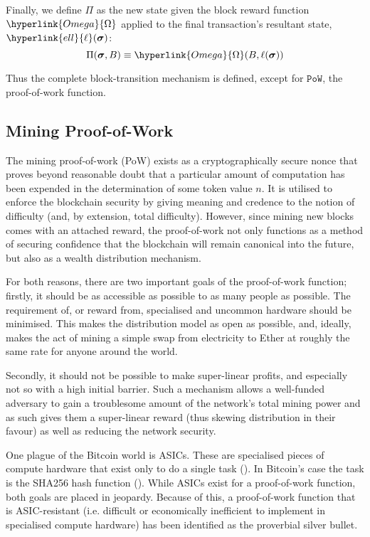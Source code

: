 \documentclass[9pt,oneside]{amsart}
\begin{document}
\begin{multicols}{2}
\hypertarget{Pi}{}Finally, we define $\Pi$ as the new state given the block reward function $\hyperlink{Omega}{\Omega}$ applied to the final transaction's resultant state, $\hyperlink{ell}{\ell}(\boldsymbol{\sigma})$:
\begin{equation}
\Pi(\boldsymbol{\sigma}, B) \equiv \hyperlink{Omega}{\Omega}(B, \ell(\boldsymbol{\sigma}))
\end{equation}

Thus the complete block-transition mechanism is defined, except for $\mathtt{PoW}$, the proof-of-work function.

\subsection{Mining Proof-of-Work} \label{ch:pow}

The mining proof-of-work (PoW) exists as a cryptographically secure nonce that proves beyond reasonable doubt that a particular amount of computation has been expended in the determination of some token value $n$. It is utilised to enforce the blockchain security by giving meaning and credence to the notion of difficulty (and, by extension, total difficulty). However, since mining new blocks comes with an attached reward, the proof-of-work not only functions as a method of securing confidence that the blockchain will remain canonical into the future, but also as a wealth distribution mechanism.

For both reasons, there are two important goals of the proof-of-work function; firstly, it should be as accessible as possible to as many people as possible. The requirement of, or reward from, specialised and uncommon hardware should be minimised. This makes the distribution model as open as possible, and, ideally, makes the act of mining a simple swap from electricity to Ether at roughly the same rate for anyone around the world.

Secondly, it should not be possible to make super-linear profits, and especially not so with a high initial barrier. Such a mechanism allows a well-funded adversary to gain a troublesome amount of the network's total mining power and as such gives them a super-linear reward (thus skewing distribution in their favour) as well as reducing the network security.

One plague of the Bitcoin world is ASICs. These are specialised pieces of compute hardware that exist only to do a single task (\cite{ASICSmithMJS}). In Bitcoin's case the task is the SHA256 hash function (\cite{Courtois2014}). While ASICs exist for a proof-of-work function, both goals are placed in jeopardy. Because of this, a proof-of-work function that is ASIC-resistant (i.e. difficult or economically inefficient to implement in specialised compute hardware) has been identified as the proverbial silver bullet.


\end{multicols}
\end{document}
